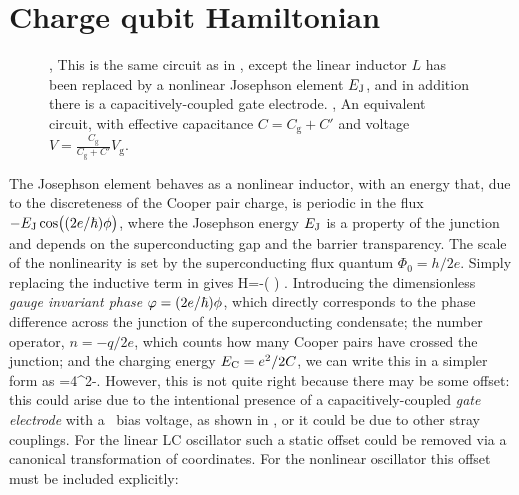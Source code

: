 \section{Charge qubit Hamiltonian}
\label{sec:transham}
\begin{figure}
 \centering
 \caption[The charge qubit]{
    , This is the same circuit as in , except the linear inductor $L$ has been replaced by a nonlinear Josephson element $E_{\text{J}}$, and in addition there is a capacitively-coupled gate electrode.
    , An equivalent circuit, with effective capacitance $C=C_\text{g}+C'$ and voltage $V=\frac{C_\text{g}}{C_\text{g}+C'}V_\text{g}$.\label{fig:cpb}}
\end{figure}%
The Josephson element behaves as a nonlinear inductor, with an energy that, due to the discreteness of the Cooper pair charge, is periodic in the flux $-E_{\text{J}} \cos\bigl((2e/\hbar) \phi\bigr)$, where the Josephson energy $E_{\text{J}}$ is a property of the junction and depends on the superconducting gap and the barrier transparency. The scale of the nonlinearity is set by the superconducting flux quantum $\Phi_0=h/2e$. Simply replacing the inductive term in  gives
\be
    \label{eq:hamcpb0}
    H=-\EJ \cos\biggl( \phi\biggr) .
\ee%
%
%
Introducing the dimensionless \emph{gauge invariant phase} ${\varphi}=(2e/\hbar) \phi$, which directly corresponds to the phase difference across the junction of the superconducting condensate; the number operator, $n=-q/2e$, which counts how many Cooper pairs have crossed the junction; and the charging energy $E_{\text{C}}=e^2/2C$, we can write this in a simpler form as
\be
    \label{eq:hamcpb1}
    =4\EC\nh^2-\EJ\cos\vph .
\ee%
%
%
%
However, this is not quite right because there may be some offset: this could arise due to the intentional presence of a capacitively-coupled \emph{gate electrode} with a \dc\ bias voltage, as shown in , or it could be due to other stray couplings. For the linear LC oscillator such a static offset could be removed via a canonical transformation of coordinates. For the nonlinear oscillator this offset must be included explicitly:
